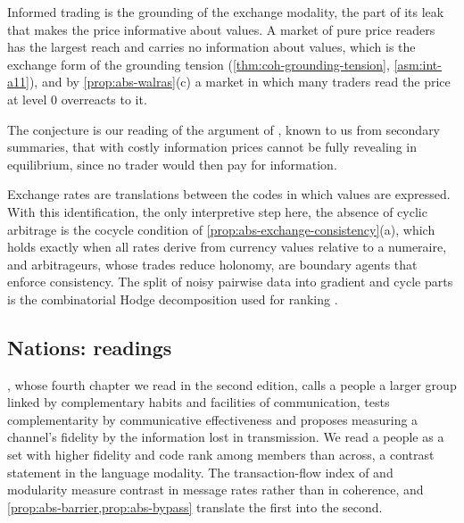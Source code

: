 \begin{conjecture}\label{conj:abs-grossman-stiglitz}
Informed trading is the grounding of the exchange modality, the part of its leak that makes the price informative about values. A market of pure price readers has the largest reach and carries no information about values, which is the exchange form of the grounding tension (\cref{thm:coh-grounding-tension}, \cref{asm:int-a11}), and by \cref{prop:abs-walras}(c) a market in which many traders read the price at level 0 overreacts to it.
\end{conjecture}

The conjecture is our reading of the argument of \citet{grossman1980impossibility}, known to us from secondary summaries, that with costly information prices cannot be fully revealing in equilibrium, since no trader would then pay for information.

Exchange rates are translations between the codes in which values are expressed. With this identification, the only interpretive step here, the absence of cyclic arbitrage is the cocycle condition of \cref{prop:abs-exchange-consistency}(a), which holds exactly when all rates derive from currency values relative to a numeraire, and arbitrageurs, whose trades reduce holonomy, are boundary agents that enforce consistency. The split of noisy pairwise data into gradient and cycle parts is the combinatorial Hodge decomposition used for ranking \citep{jiang2011statistical}.

\subsection{Nations: readings}\label{sup:abs-nations-readings}

\citet{deutsch1953nationalism}, whose fourth chapter we read in the second edition, calls a people a larger group linked by complementary habits and facilities of communication, tests complementarity by communicative effectiveness and proposes measuring a channel's fidelity by the information lost in transmission. We read a people as a set with higher fidelity and code rank among members than across, a contrast statement in the language modality. The transaction-flow index of \citet{savage1960statistical} and modularity \citep{newman2006modularity} measure contrast in message rates rather than in coherence, and \cref{prop:abs-barrier,prop:abs-bypass} translate the first into the second.

